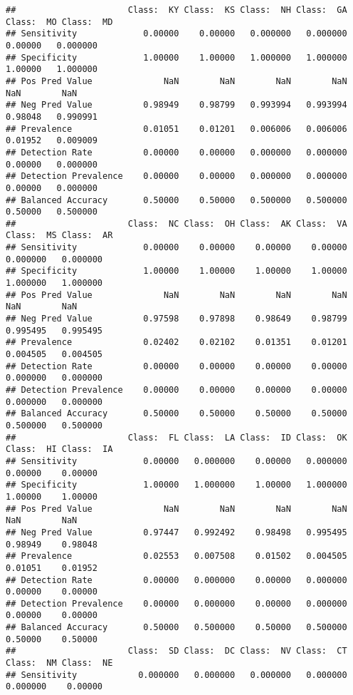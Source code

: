 \documentclass[
]{article}
\begin{document}
\begin{verbatim}
##                      Class:  KY Class:  KS Class:  NH Class:  GA Class:  MO Class:  MD
## Sensitivity             0.00000    0.00000   0.000000   0.000000    0.00000   0.000000
## Specificity             1.00000    1.00000   1.000000   1.000000    1.00000   1.000000
## Pos Pred Value              NaN        NaN        NaN        NaN        NaN        NaN
## Neg Pred Value          0.98949    0.98799   0.993994   0.993994    0.98048   0.990991
## Prevalence              0.01051    0.01201   0.006006   0.006006    0.01952   0.009009
## Detection Rate          0.00000    0.00000   0.000000   0.000000    0.00000   0.000000
## Detection Prevalence    0.00000    0.00000   0.000000   0.000000    0.00000   0.000000
## Balanced Accuracy       0.50000    0.50000   0.500000   0.500000    0.50000   0.500000
##                      Class:  NC Class:  OH Class:  AK Class:  VA Class:  MS Class:  AR
## Sensitivity             0.00000    0.00000    0.00000    0.00000   0.000000   0.000000
## Specificity             1.00000    1.00000    1.00000    1.00000   1.000000   1.000000
## Pos Pred Value              NaN        NaN        NaN        NaN        NaN        NaN
## Neg Pred Value          0.97598    0.97898    0.98649    0.98799   0.995495   0.995495
## Prevalence              0.02402    0.02102    0.01351    0.01201   0.004505   0.004505
## Detection Rate          0.00000    0.00000    0.00000    0.00000   0.000000   0.000000
## Detection Prevalence    0.00000    0.00000    0.00000    0.00000   0.000000   0.000000
## Balanced Accuracy       0.50000    0.50000    0.50000    0.50000   0.500000   0.500000
##                      Class:  FL Class:  LA Class:  ID Class:  OK Class:  HI Class:  IA
## Sensitivity             0.00000   0.000000    0.00000   0.000000    0.00000    0.00000
## Specificity             1.00000   1.000000    1.00000   1.000000    1.00000    1.00000
## Pos Pred Value              NaN        NaN        NaN        NaN        NaN        NaN
## Neg Pred Value          0.97447   0.992492    0.98498   0.995495    0.98949    0.98048
## Prevalence              0.02553   0.007508    0.01502   0.004505    0.01051    0.01952
## Detection Rate          0.00000   0.000000    0.00000   0.000000    0.00000    0.00000
## Detection Prevalence    0.00000   0.000000    0.00000   0.000000    0.00000    0.00000
## Balanced Accuracy       0.50000   0.500000    0.50000   0.500000    0.50000    0.50000
##                      Class:  SD Class:  DC Class:  NV Class:  CT Class:  NM Class:  NE
## Sensitivity            0.000000   0.000000   0.000000   0.000000   0.000000    0.00000

\end{verbatim}
\end{document}
